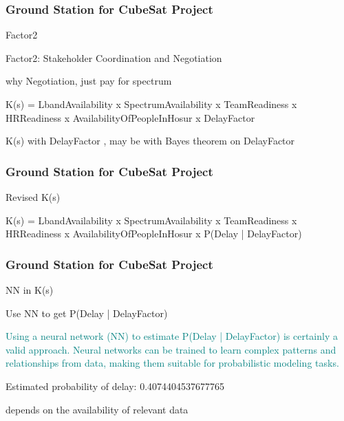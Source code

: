 \newpage
\begin{frame}
\frametitle{Ground Station for CubeSat Project }
\begin{block}{Factor2}


Factor2: Stakeholder Coordination and Negotiation

why Negotiation, just pay for spectrum

K(s) = LbandAvailability x SpectrumAvailability x TeamReadiness x HRReadiness x AvailabilityOfPeopleInHosur x DelayFactor

K(s) with DelayFactor  , may be with Bayes theorem on DelayFactor 

\end{block}
\end{frame}


\newpage
\begin{frame}
\frametitle{Ground Station for CubeSat Project }
\begin{block}{Revised K(s)}

K(s) = LbandAvailability x SpectrumAvailability x TeamReadiness x HRReadiness x AvailabilityOfPeopleInHosur x P(Delay | DelayFactor)


\end{block}
\end{frame}


\newpage
\begin{frame}
\frametitle{Ground Station for CubeSat Project }
\begin{block}{NN in K(s)}


Use NN to get P(Delay | DelayFactor)

\textcolor{teal}{
Using a neural network (NN) to estimate P(Delay | DelayFactor) is certainly a valid approach. Neural networks can be trained to learn complex patterns and relationships from data, making them suitable for probabilistic modeling tasks.}

Estimated probability of delay: 0.4074404537677765

 depends on the availability of relevant data 
 

\end{block}
\end{frame}





